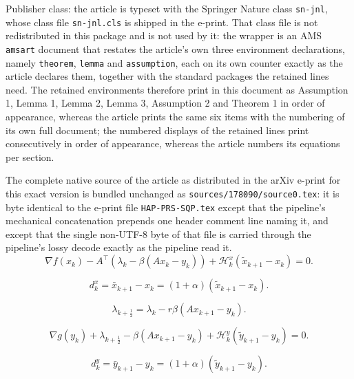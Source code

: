\documentclass[10pt,a4paper]{amsart}
\begin{document}
Publisher class: the article is typeset with the Springer Nature class \texttt{sn-jnl}, whose class file \texttt{sn-jnl.cls} is shipped in the e-print. That class file is not redistributed in this package and is not used by it: the wrapper is an AMS \texttt{amsart} document that restates the article's own three environment declarations, namely \texttt{theorem}, \texttt{lemma} and \texttt{assumption}, each on its own counter exactly as the article declares them, together with the standard packages the retained lines need. The retained environments therefore print in this document as Assumption 1, Lemma 1, Lemma 2, Lemma 3, Assumption 2 and Theorem 1 in order of appearance, whereas the article prints the same six items with the numbering of its own full document; the numbered displays of the retained lines print consecutively in order of appearance, whereas the article numbers its equations per section.

The complete native source of the article as distributed in the arXiv e-print for this exact version is bundled unchanged as \texttt{sources/178090/source0.tex}: it is byte identical to the e-print file \texttt{HAP-PRS-SQP.tex} except that the pipeline's mechanical concatenation prepends one header comment line naming it, and except that the single non-UTF-8 byte of that file is carried through the pipeline's lossy decode exactly as the pipeline read it.
\begin{equation}\label{xoc}
\nabla f(x_{k})-A^{\top}(\lambda_{k}-\beta(A x_{k}-y_{k}))+\mathcal{H}_k^x(\tilde{x}_{k+1}-x_{k})=0.
\end{equation}

\begin{equation}\label{sd-x}
d_{k}^{x} = \bar{x}_{k+1}-x_{k}=(1+\alpha)(\tilde{x}_{k+1}-x_{k}).
\end{equation}

\begin{equation}\label{lambda1}
\lambda_{k+\frac{1}{2}} = \lambda_{k}-r \beta(A x_{k+1}-y_{k}).
\end{equation}

\begin{equation}\label{yoc}
\nabla g (y_{k})+\lambda_{k+\frac{1}{2}}-\beta(A x_{k+1}-y_{k})+\mathcal{H}_k^y(\tilde{y}_{k+1}-y_{k})=0.
\end{equation}

\begin{equation}\label{sd-y}
d_{k}^{y} = \bar{y}_{k+1}-y_{k}=(1+\alpha)(\tilde{y}_{k+1}-y_{k}).
\end{equation}
\end{document}
